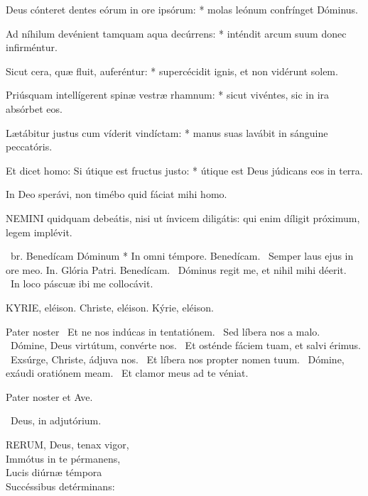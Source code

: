 Deus cónteret dentes eórum in ore ipsórum: * molas leónum confrínget Dóminus.

Ad níhilum devénient tamquam aqua decúrrens: * inténdit arcum suum donec infirméntur.

Sicut cera, quæ fluit, auferéntur: * supercécidit ignis, et non vidérunt solem.

Priúsquam intellígerent spinæ vestræ rhamnum: * sicut vivéntes, sic in ira absórbet eos.

Lætábitur justus cum víderit vindíctam: * manus suas lavábit in sánguine peccatóris.

Et dicet homo: Si útique est fructus justo: * útique est Deus júdicans eos in terra.

 In Deo sperávi, non timébo quid fáciat mihi homo.



\lettrine[lines=2]{N}{EMINI} quidquam debeátis, nisi ut ínvicem diligátis: qui enim díligit próximum, legem implévit.

\R\ br. Benedícam Dóminum * In omni témpore. Benedícam. \V\ Semper laus ejus in ore meo. In. Glória Patri. Benedícam. \V\ Dóminus regit me, et nihil mihi déerit. \R\ In loco páscuæ ibi me collocávit.



KYRIE, eléison. Christe, eléison. Kýrie, eléison.

Pater noster  \V\ Et ne nos indúcas in tentatiónem. \R\ Sed líbera nos a malo. \V\ Dómine, Deus virtútum, convérte nos. \R\ Et osténde fáciem tuam, et salvi érimus. \V\ Exsúrge, Christe, ádjuva nos. \R\ Et líbera nos propter nomen tuum. \V\ Dómine, exáudi oratiónem meam. \R\ Et clamor meus ad te véniat.



Pater noster et Ave.

\V\ Deus, in adjutórium.


\lettrine[lines=2]{R}{ERUM}, Deus, tenax vigor,\\
Immótus in te pérmanens,\\
Lucis diúrnæ témpora\\
Succéssibus detérminans:

